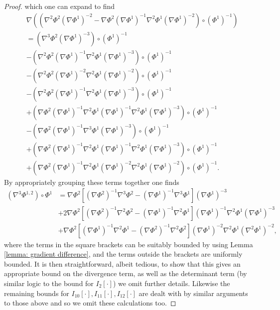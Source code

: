 \documentclass[a4paper]{amsart}
\numberwithin{equation}{section}
\newcommand{\grad}{\nabla}
\theoremstyle{plain}
\begin{document}
\begin{proof}
       which one can expand to find
       \begin{align*}
           &\grad \left(\left(\grad^2 \Phi^2 (\grad \Phi^1)^{-2} - \grad \Phi^2 (\grad \Phi^1)^{-1} \grad^2 \Phi^1 (\grad \Phi^1)^{-2}\right)\circ (\Phi^1)^{-1}\right)\\
           &= \left(\grad^3 \Phi^2 (\grad \Phi^1)^{-3}\right) \circ (\Phi^1)^{-1}\\
           &- \left(\grad^2 \Phi^2 (\grad \Phi^1)^{-1} \grad^2 \Phi^1 (\grad \Phi^1)^{-3}\right)\circ (\Phi^1)^{-1}\\
           &- \left( \grad^2 \Phi^2(\grad \Phi^1)^{-2} \grad^2 \Phi^1 (\grad \Phi^1)^{-2} \right) \circ (\Phi^1)^{-1}\\
           & - \left(\grad^2 \Phi^2 (\grad \Phi^1)^{-1} \grad^2 \Phi^1 (\grad \Phi^1)^{-3} \right) \circ (\Phi^1)^{-1}\\
           & + \left( \grad \Phi^2 (\grad \Phi^1)^{-1} \grad^2 \Phi^1 (\grad \Phi^1)^{-1}\grad^2 \Phi^1 (\grad \Phi^1)^{-3} \right) \circ (\Phi^1)^{-1}\\
           & - \left(\grad \Phi^2 (\grad \Phi^1)^{-1} \grad^3 \Phi^1 (\grad \Phi^1)^{-3}\right)\circ (\Phi^1)^{-1}\\
           & + \left(\grad \Phi^2 (\grad \Phi^1)^{-1} \grad^2 \Phi^1 (\grad \Phi^1)^{-1} \grad^2 \Phi^1  (\grad \Phi^1)^{-3}\right)\circ (\Phi^1)^{-1}\\
           & + \left(\grad \Phi^2 (\grad \Phi^1)^{-1} \grad^2 \Phi^1 (\grad \Phi^1)^{-2} \grad^2 \Phi^1  (\grad \Phi^1)^{-2}\right)\circ (\Phi^1)^{-1}.
       \end{align*}
       By appropriately grouping these terms together one finds
       \begin{align*}
           (\grad^3 \Phi^{1,2}) \circ \Phi^1 &= \grad \Phi^2 \left[ (\grad \Phi^2)^{-1}\grad^3 \Phi^2 - (\grad \Phi^1)^{-1}\grad^3 \Phi^1\right] (\grad \Phi^1)^{-3}\\
           &+2 \grad \Phi^2 \left[ (\grad \Phi^2)^{-1}\grad^2 \Phi^2 - (\grad \Phi^1)^{-1}\grad^2 \Phi^1\right] (\grad \Phi^1)^{-1} \grad^2 \Phi^1 (\grad \Phi^1)^{-3}\\
           &+ \grad \Phi^2 \left[ (\grad \Phi^1)^{-1} \grad^2 \Phi^1 - (\grad \Phi^2)^{-1} \grad^2 \Phi^2 \right] (\grad \Phi^1)^{-2} \grad^2 \Phi^1 (\grad^2 \Phi^1)^{-2},
       \end{align*}
       where the terms in the square brackets can be suitably bounded by using Lemma \ref{lemma: gradient difference}, and the terms outside the brackets are uniformly bounded.
       It is then straightforward, albeit tedious, to show that this gives an appropriate bound on the divergence term, as well as the determinant term (by similar logic to the bound for $I_2[\cdot]$) we omit further details.
       Likewise the remaining bounds for $I_{10}[\cdot], I_{11}[\cdot], I_{12}[\cdot]$ are dealt with by similar arguments to those above and so we omit these calculations too.
   \end{proof}
\end{document}
